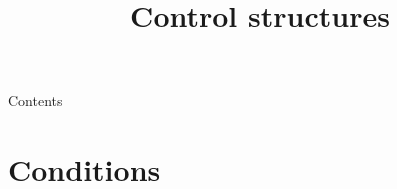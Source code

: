 
\newcommand{\topic}{
	Control structures
}
\usepackage{tikz}
\title{\topic}
\supertitle{\course}
\date{}



\maketitle

\begin{frame}{Contents}
	\tableofcontents
\end{frame}

\section{Conditions}
